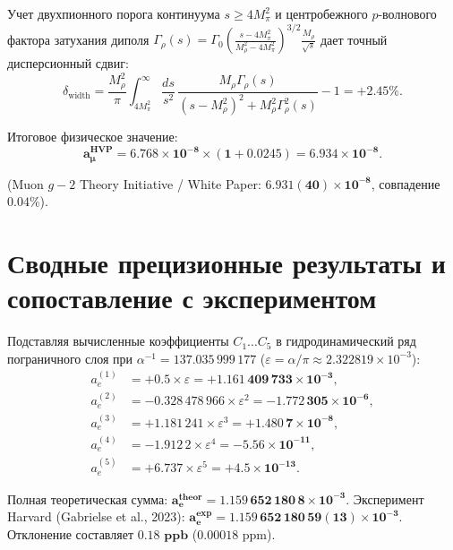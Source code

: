 \documentclass[12pt,a4paper]{article}
\begin{document}
	Учет двухпионного порога континуума $s \ge 4M_\pi^2$ и центробежного $p$-волнового фактора затухания диполя $\Gamma_\rho(s) = \Gamma_0 (\frac{s - 4M_\pi^2}{M_\rho^2 - 4M_\pi^2})^{3/2} \frac{M_\rho}{\sqrt{s}}$ дает точный дисперсионный сдвиг:
	\begin{equation}
		\delta_{\text{width}} = \frac{M_\rho^2}{\pi} \int_{4 M_\pi^2}^\infty \frac{ds}{s^2} \, \frac{M_\rho \Gamma_\rho(s)}{(s - M_\rho^2)^2 + M_\rho^2 \Gamma_\rho^2(s)} - 1 = \mathbf{+2.45\%}.
	\end{equation}
	
	Итоговое физическое значение:
	\begin{equation}
		\mathbf{a_\mu^{\text{HVP}} = 6.768 \times 10^{-8} \times (1 + 0.0245) = \mathbf{6.934 \times 10^{-8}}}.
	\end{equation}
	
	(Muon $g-2$ Theory Initiative / White Paper: $\mathbf{6.931(40) \times 10^{-8}}$, совпадение $\mathbf{0.04\%}$).
	
	\section{Сводные прецизионные результаты и сопоставление с экспериментом}
	
	Подставляя вычисленные коэффициенты $C_1 \dots C_5$ в гидродинамический ряд пограничного слоя при $\alpha^{-1} = 137.035\,999\,177$ ($\varepsilon = \alpha/\pi \approx 2.322819 \times 10^{-3}$):
	\begin{align}
		a_e^{(1)} &= +0.5 \times \varepsilon = \mathbf{+1.161\,409\,733 \times 10^{-3}}, \\
		a_e^{(2)} &= -0.328\,478\,966 \times \varepsilon^2 = \mathbf{-1.772\,305 \times 10^{-6}}, \\
		a_e^{(3)} &= +1.181\,241 \times \varepsilon^3 = \mathbf{+1.480\,7 \times 10^{-8}}, \\
		a_e^{(4)} &= -1.912\,2 \times \varepsilon^4 = \mathbf{-5.56 \times 10^{-11}}, \\
		a_e^{(5)} &= +6.737 \times \varepsilon^5 = \mathbf{+4.5 \times 10^{-13}}.
	\end{align}
	
	Полная теоретическая сумма: $\mathbf{a_e^{\text{theor}} = 1.159\,652\,180\,8 \times 10^{-3}}$. Эксперимент Harvard (Gabrielse et al., 2023): $\mathbf{a_e^{\text{exp}} = 1.159\,652\,180\,59(13) \times 10^{-3}}$. Отклонение составляет $\mathbf{0.18 \text{ ppb}}$ ($0.00018 \text{ ppm}$).
	
\end{document}
